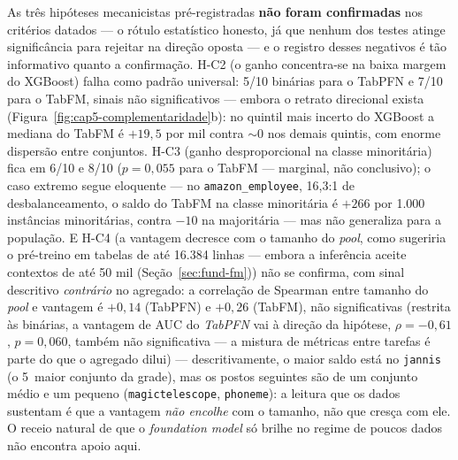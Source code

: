 As três hipóteses mecanicistas pré-registradas \textbf{não foram
confirmadas} nos critérios datados --- o rótulo estatístico honesto,
já que nenhum dos testes atinge significância para rejeitar na
direção oposta --- e o registro desses negativos é tão
informativo quanto a confirmação. H-C2 (o ganho concentra-se na baixa
margem do XGBoost) falha como padrão universal: 5/10 binárias para o
TabPFN e 7/10 para o TabFM, sinais não significativos --- embora o
retrato direcional exista
(Figura~\ref{fig:cap5-complementaridade}b): no quintil mais incerto do
XGBoost a mediana do TabFM é $+19{,}5$ por mil contra ${\sim}0$ nos
demais quintis, com enorme dispersão entre conjuntos. H-C3 (ganho
desproporcional na classe minoritária) fica em 6/10 e 8/10
($p = 0{,}055$ para o TabFM --- marginal, não conclusivo); o caso
extremo segue eloquente --- no \texttt{amazon\_\allowbreak employee},
16{,}3:1 de desbalanceamento, o saldo do TabFM na classe minoritária é
$+266$ por 1.000 instâncias minoritárias, contra $-10$ na majoritária
--- mas não generaliza para a população. E H-C4 (a vantagem decresce
com o tamanho do \emph{pool}, como sugeriria o pré-treino em tabelas
de até 16.384 linhas --- embora a inferência aceite contextos de até
50 mil (Seção~\ref{sec:fund-fm})) não se
confirma, com sinal descritivo \emph{contrário} no agregado: a
correlação de Spearman entre
tamanho do \emph{pool} e vantagem é $+0{,}14$ (TabPFN) e $+0{,}26$
(TabFM), não significativas (restrita às binárias, a vantagem de AUC
do \emph{TabPFN} vai à direção da hipótese, $\rho=-0{,}61$,
$p=0{,}060$, também não significativa --- a mistura de métricas entre
tarefas é parte do que o agregado dilui) --- descritivamente, o maior saldo está no
\texttt{jannis} (o 5\textordmasculine\ maior conjunto da grade), mas os postos seguintes são
de um conjunto médio e um pequeno (\texttt{magictelescope},
\texttt{phoneme}): a leitura que os dados sustentam é que a vantagem
\emph{não encolhe} com o tamanho, não que cresça com ele. O
receio natural de que o \emph{foundation model} só brilhe no regime de
poucos dados não encontra apoio aqui.

